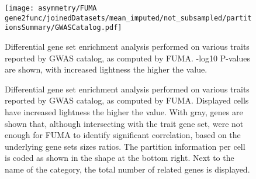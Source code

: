 \begin{figure}[H]
	\centering
	\texttt{[image: asymmetry/FUMA gene2func/joinedDatasets/mean\_imputed/not\_subsampled/partitionsSummary/GWASCatalog.pdf]}
	
	\caption[GWAS Catalog \acs{gsea} -log10P values]{Differential gene set enrichment analysis performed on various traits reported by GWAS catalog, as computed by FUMA. -log10 P-values are shown, with increased lightness the higher the value.}
	\label{fig:gw_catalog}
\end{figure}
\begin{figure}[H]
	\begin{adjustwidth}{-3cm}{-3cm}
	\centering
	\par\medskip
	\raggedleft
	\caption[GWAS Catalog GSEA genes]{Differential gene set enrichment analysis performed on various traits reported by GWAS catalog, as computed by FUMA. Displayed cells have increased lightness the higher the value. With gray, genes are shown that, although intersecting with the trait gene set, were not enough for FUMA to identify significant correlation, based on the underlying gene sets sizes ratios. The partition information per cell is coded as shown in the shape at the bottom right. Next to the name of the category, the total number of related genes is displayed.}
	\label{fig:gw_catalog_genes}
\end{adjustwidth}
\end{figure}